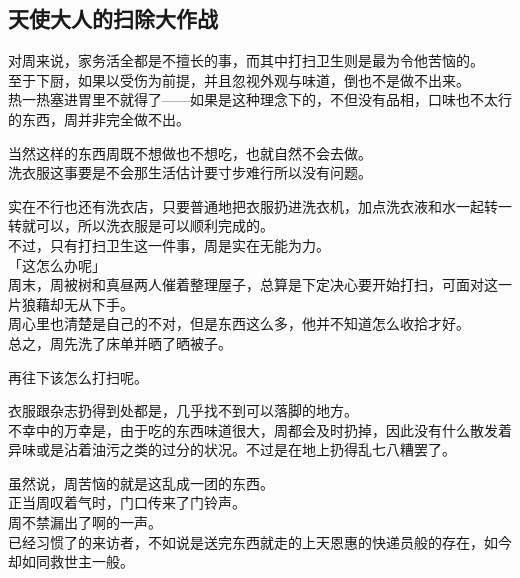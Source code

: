 \subsection{天使大人的扫除大作战}

对周来说，家务活全都是不擅长的事，而其中打扫卫生则是最为令他苦恼的。\\

至于下厨，如果以受伤为前提，并且忽视外观与味道，倒也不是做不出来。\\

热一热塞进胃里不就得了——如果是这种理念下的，不但没有品相，口味也不太行的东西，周并非完全做不出。

当然这样的东西周既不想做也不想吃，也就自然不会去做。\\

洗衣服这事要是不会那生活估计要寸步难行所以没有问题。

实在不行也还有洗衣店，只要普通地把衣服扔进洗衣机，加点洗衣液和水一起转一转就可以，所以洗衣服是可以顺利完成的。\\

不过，只有打扫卫生这一件事，周是实在无能为力。\\

「这怎么办呢」\\

周末，周被树和真昼两人催着整理屋子，总算是下定决心要开始打扫，可面对这一片狼藉却无从下手。\\

周心里也清楚是自己的不对，但是东西这么多，他并不知道怎么收拾才好。\\

总之，周先洗了床单并晒了晒被子。

再往下该怎么打扫呢。

衣服跟杂志扔得到处都是，几乎找不到可以落脚的地方。\\

不幸中的万幸是，由于吃的东西味道很大，周都会及时扔掉，因此没有什么散发着异味或是沾着油污之类的过分的状况。不过是在地上扔得乱七八糟罢了。

虽然说，周苦恼的就是这乱成一团的东西。\\

正当周叹着气时，门口传来了门铃声。\\

周不禁漏出了啊的一声。\\

已经习惯了的来访者，不如说是送完东西就走的上天恩惠的快递员般的存在，如今却如同救世主一般。\\

